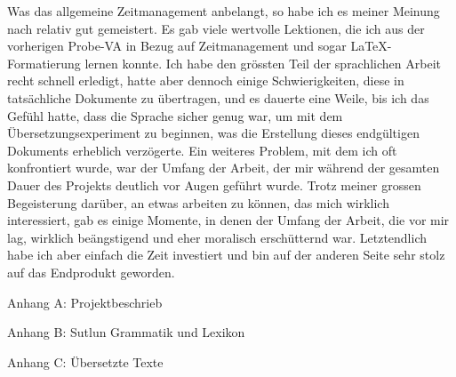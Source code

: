 \documentclass{article}
\begin{document}
Was das allgemeine Zeitmanagement anbelangt, so habe ich es meiner Meinung nach relativ gut gemeistert.
Es gab viele wertvolle Lektionen, die ich aus der vorherigen Probe-VA in Bezug auf Zeitmanagement
und sogar \LaTeX-Formatierung lernen konnte. Ich habe den grössten Teil der sprachlichen Arbeit recht
schnell erledigt, hatte aber dennoch einige Schwierigkeiten, diese in tatsächliche Dokumente zu übertragen,
und es dauerte eine Weile, bis ich das Gefühl hatte, dass die Sprache sicher genug war,
um mit dem Übersetzungsexperiment zu beginnen, was die Erstellung dieses endgültigen Dokuments erheblich verzögerte.
Ein weiteres Problem, mit dem ich oft konfrontiert wurde, war der Umfang der Arbeit,
der mir während der gesamten Dauer des Projekts deutlich vor Augen geführt wurde.
Trotz meiner grossen Begeisterung darüber, an etwas arbeiten zu können, das mich wirklich interessiert,
gab es einige Momente, in denen der Umfang der Arbeit, die vor mir lag, wirklich beängstigend und eher
moralisch erschütternd war. Letztendlich habe ich aber einfach die Zeit investiert und bin auf der anderen
Seite sehr stolz auf das Endprodukt geworden.







\renewcommand{\section}[1]{
    \begin{center}
    \vspace*{\fill}
    \Huge{#1}
    \vspace*{\fill}
    \end{center}
}

\section{Anhang A: Projektbeschrieb}


\section{Anhang B: Sutlun Grammatik und Lexikon}


\section{Anhang C: Übersetzte Texte}

\end{document}
